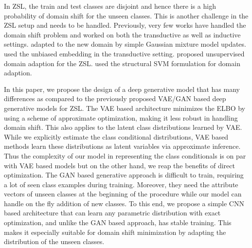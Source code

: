\documentclass[10pt,twocolumn,letterpaper]{article}
\begin{document}
In ZSL, the train and test classes are disjoint and hence there is a high probability of domain shift for the unseen classes. This is another challenge in the ZSL setup and needs to be handled. Previously, very few works have handled the domain shift problem and worked on both the transductive as well as inductive settings. \cite{verma2017simple} adapted to the new domain by simple Gaussian mixture model updates. \cite{song2018transductive} used the unbiased embedding in the transductive setting. \cite{kodirov2015unsupervisedDA,ye2017zero_DOMAIN} proposed unsupervised domain adaption for the ZSL. \cite{saligram2016learningJoint} used the structural SVM formulation for domain adaption.



In this paper, we propose the design of a deep generative model that has many differences as compared to the previously proposed VAE/GAN based deep generative models for ZSL. The VAE based architecture minimizes the ELBO \cite{VAE} by using a scheme of approximate optimization, making it less robust in handling domain shift. This also applies to the latent class distributions learned by VAE. While we explicitly estimate the class conditional distributions, VAE based methods learn these distributions as latent variables via approximate inference. Thus the complexity of our model in representing the class conditionals is on par with VAE based models but on the other hand, we reap the benefits of direct optimization. The GAN based generative approach is difficult to train, requiring a lot of seen class examples during training. Moreover, they need the attribute vectors of unseen classes at the beginning of the procedure while our model can handle on the fly addition of new classes.
To this end, we propose a simple CNN based architecture that can learn any parametric distribution with exact optimization, and unlike the GAN based approach, has stable training. This makes it especially suitable for domain shift minimization by adapting the distribution of the unseen classes. 
\end{document}
